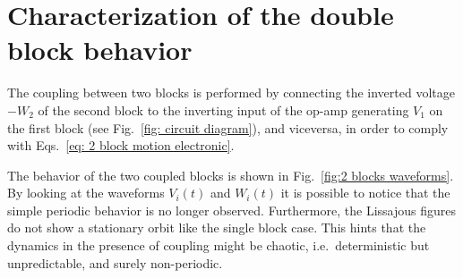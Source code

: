 \section{Characterization of the double block behavior}\label{sec: double block characterization}

The coupling between two blocks is performed by connecting the inverted voltage $-W_2$ of the second block to the
inverting input of the op-amp generating $V_1$ on the first block (see Fig.~\ref{fig: circuit diagram}), and viceversa, in order
to comply with Eqs.~\ref{eq: 2 block motion electronic}.

The behavior of the two coupled blocks is shown in Fig.~\ref{fig:2 blocks waveforms}.
By looking at the waveforms $V_i(t)$ and $W_i(t)$ it is possible to notice that the simple periodic behavior
is no longer observed. Furthermore, the Lissajous figures do not show a stationary orbit like the single block case.
This hints that the dynamics in the presence of coupling might be chaotic, i.e.\ deterministic but unpredictable,
and surely non-periodic.

